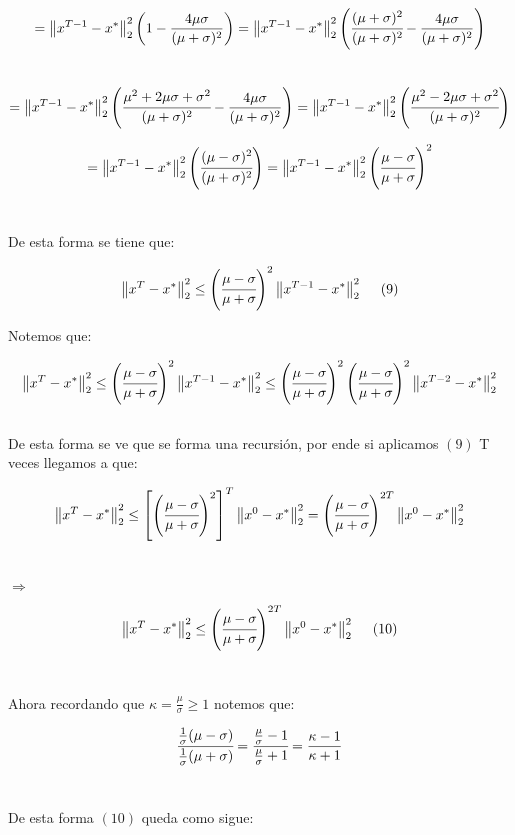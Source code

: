 \documentclass[11pt]{article}
\begin{document}
\[ = \left\| x^{T-1} - x^{*} \right\|_2^2 \left( 1 - \frac{4 \mu \sigma}{(\mu+\sigma)^2} \right) = \left\| x^{T-1} - x^{*} \right\|_2^2 \left( \cfrac{(\mu + \sigma)^2}{(\mu + \sigma)^2} - \frac{4 \mu \sigma}{(\mu+\sigma)^2} \right)  \] \\

\[ = \left\| x^{T-1} - x^{*} \right\|_2^2 \left( \cfrac{\mu^2 + 2 \mu \sigma + \sigma^2}{(\mu + \sigma)^2} - \frac{4 \mu \sigma}{(\mu+\sigma)^2} \right) = \left\| x^{T-1} - x^{*} \right\|_2^2 \left( \cfrac{\mu^2 - 2 \mu \sigma + \sigma^2}{(\mu + \sigma)^2}  \right)  \]

\[ = \left\| x^{T-1} - x^{*} \right\|_2^2 \left( \cfrac{(\mu-\sigma)^2}{(\mu + \sigma)^2}  \right) = \left\| x^{T-1} - x^{*} \right\|_2^2 \left( \cfrac{\mu-\sigma}{\mu + \sigma}  \right)^2 \] \

De esta forma se tiene que:

\[ \left\| x^{T} - x^{*} \right\|_2^2 \leq \left( \cfrac{\mu-\sigma}{\mu + \sigma}  \right)^2 \left\| x^{T-1} - x^{*} \right\|_2^2 \ \ \ \ (9) \]

Notemos que:

\[ \left\| x^{T} - x^{*} \right\|_2^2 \leq \left( \cfrac{\mu-\sigma}{\mu + \sigma}  \right)^2 \left\| x^{T-1} - x^{*} \right\|_2^2  \leq \left( \cfrac{\mu-\sigma}{\mu + \sigma}  \right)^2 \left( \cfrac{\mu-\sigma}{\mu + \sigma}  \right)^2 \left\| x^{T-2} - x^{*} \right\|_2^2 \] \\

De esta forma se ve que se forma una recursión, por ende si aplicamos $(9)$ T veces llegamos a que:

\[ \left\| x^{T} - x^{*} \right\|_2^2 \leq \left[ \left( \cfrac{\mu-\sigma}{\mu + \sigma}  \right)^2 \right]^T \left\| x^{0} - x^{*} \right\|_2^2 =  \left( \cfrac{\mu-\sigma}{\mu + \sigma}  \right)^{2T}  \left\| x^{0} - x^{*} \right\|_2^2  \] \

$ \Rightarrow $

\[ \left\| x^{T} - x^{*} \right\|_2^2 \leq  \left( \cfrac{\mu-\sigma}{\mu + \sigma}  \right)^{2T}  \left\| x^{0} - x^{*} \right\|_2^2 \ \ \ \ (10)  \] \

Ahora recordando que $ \kappa = \frac{\mu}{\sigma} \geq 1 $ notemos que:

\[ \cfrac{\frac{1}{\sigma}(\mu - \sigma)}{\frac{1}{\sigma}(\mu + \sigma)} = \cfrac{ \frac{\mu}{\sigma} - 1}{\frac{\mu}{\sigma}+ 1 } = \frac{\kappa - 1}{\kappa + 1} \] \

De esta forma $(10)$ queda como sigue:
\end{document}
